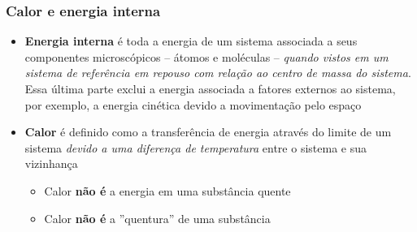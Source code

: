 \documentclass[t,%
brazilian,%
11pt,%
aspectratio=169,%
table%
]{beamer}
\begin{document}


\begin{frame}
    \frametitle{Calor e energia interna}
    \begin{itemize}
        \item \textbf{Energia interna} é toda a energia de um sistema associada
            a seus componentes microscópicos -- átomos e moléculas --
            \textit{quando vistos em um sistema de referência em repouso com
            relação ao centro de massa do sistema}. Essa última parte exclui a
            energia associada a fatores externos ao sistema, por exemplo, a
            energia cinética devido a movimentação pelo espaço

        \item \textbf{Calor} é definido como a transferência de energia através
            do limite de um sistema \textit{devido a uma diferença de
            temperatura} entre o sistema e sua vizinhança

            \begin{itemize}
                \item Calor \textbf{não é} a energia em uma substância quente
                \item Calor \textbf{não é} a ''quentura'' de uma substância
            \end{itemize}
    \end{itemize}
\end{frame}
\end{document}
